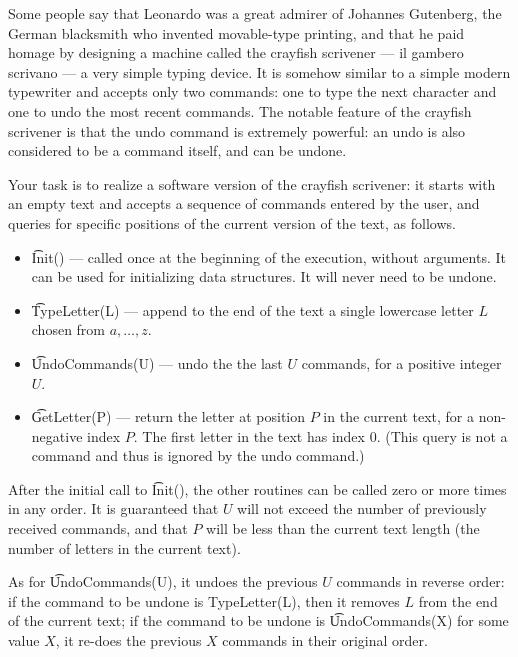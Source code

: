Some people say that Leonardo was a great admirer of Johannes Gutenberg, the German blacksmith who invented movable-type printing, and that he paid homage by designing a machine called the crayfish scrivener --- il gambero scrivano --- a very simple typing device. It is somehow similar to a simple modern typewriter and accepts only two commands: one to type the next character and one to undo the most recent commands. The notable feature of the crayfish scrivener is that the undo command is extremely powerful: an undo is also considered to be a command itself, and can be undone.

Your task is to realize a software version of the crayfish scrivener: it starts with an empty text and accepts a sequence of commands entered by the user, and queries for specific positions of the current version of the text, as follows.

\begin{itemize}
\item \t{Init()} --- called once at the beginning of the execution, without arguments. It can be used for initializing data structures. It will never need to be undone.

\item \t{TypeLetter(L)} --- append to the end of the text a single lowercase letter $L$ chosen from $a, \dots, z$.

\item \t{UndoCommands(U)} --- undo the the last $U$ commands, for a positive integer $U$.

\item \t{GetLetter(P)} --- return the letter at position $P$ in the current text, for a non-negative index $P$. The first letter in the text has index $0$. (This query is not a command and thus is ignored by the undo command.)
\end{itemize}

After the initial call to \t{Init()}, the other routines can be called zero or more times in any order. It is guaranteed that $U$ will not exceed the number of previously received commands, and that $P$ will be less than the current text length (the number of letters in the current text).

As for \t{UndoCommands(U)}, it undoes the previous $U$ commands in reverse order: if the command to be undone is TypeLetter(L), then it removes $L$ from the end of the current text; if the command to be undone is \t{UndoCommands(X)} for some value $X$, it re-does the previous $X$ commands in their original order.

